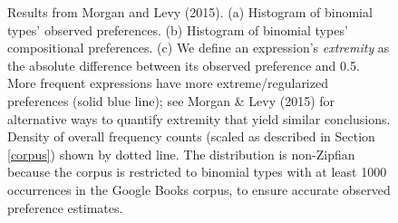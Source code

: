 \documentclass{evolang11}
\begin{document}
\begin{figure}[t]
\begin{center}
{	}

\end{center}
\caption{\footnotesize Results from Morgan and Levy (2015).  (a) Histogram of binomial types' observed preferences. (b) Histogram of binomial types' compositional preferences. (c) We define an expression's \emph{extremity} as the absolute difference between its observed preference and 0.5. More frequent expressions have more extreme/regularized preferences (solid blue line); see Morgan \& Levy (2015) for alternative ways to quantify extremity that yield similar conclusions. Density of overall frequency counts (scaled as described in Section \ref{corpus}) shown by dotted line. The distribution is non-Zipfian because the corpus is restricted to binomial types with at least 1000 occurrences in the Google Books corpus, to ensure accurate observed preference estimates.}
\end{figure}
\end{document}
